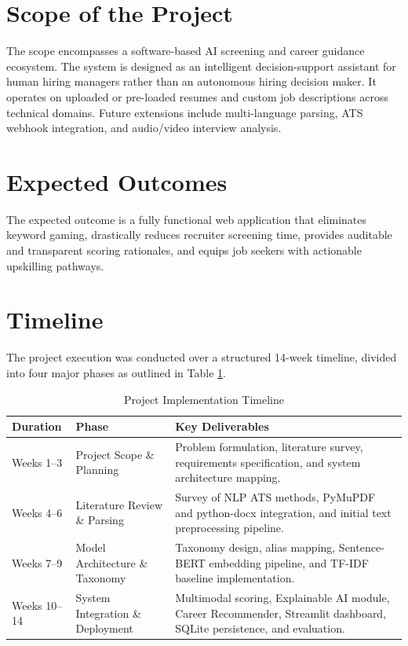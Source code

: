 \documentclass[12pt,a4paper]{report}
\begin{document}
\section{Scope of the Project}
The scope encompasses a software-based AI screening and career guidance ecosystem. The system is designed as an intelligent decision-support assistant for human hiring managers rather than an autonomous hiring decision maker. It operates on uploaded or pre-loaded resumes and custom job descriptions across technical domains. Future extensions include multi-language parsing, ATS webhook integration, and audio/video interview analysis.

\section{Expected Outcomes}
The expected outcome is a fully functional web application that eliminates keyword gaming, drastically reduces recruiter screening time, provides auditable and transparent scoring rationales, and equips job seekers with actionable upskilling pathways.

\section{Timeline}
The project execution was conducted over a structured 14-week timeline, divided into four major phases as outlined in Table \ref{tab:timeline}.

\begin{table}[h!]
\centering
\caption{Project Implementation Timeline}
\label{tab:timeline}
\begin{tabular}{|p{2.5cm}|p{4cm}|p{8cm}|}
\hline
\textbf{Duration} & \textbf{Phase} & \textbf{Key Deliverables} \\ \hline
Weeks 1--3 & Project Scope \& Planning & Problem formulation, literature survey, requirements specification, and system architecture mapping. \\ \hline
Weeks 4--6 & Literature Review \& Parsing & Survey of NLP ATS methods, PyMuPDF and python-docx integration, and initial text preprocessing pipeline. \\ \hline
Weeks 7--9 & Model Architecture \& Taxonomy & Taxonomy design, alias mapping, Sentence-BERT embedding pipeline, and TF-IDF baseline implementation. \\ \hline
Weeks 10--14 & System Integration \& Deployment & Multimodal scoring, Explainable AI module, Career Recommender, Streamlit dashboard, SQLite persistence, and evaluation. \\ \hline
\end{tabular}
\end{table}
\end{document}
